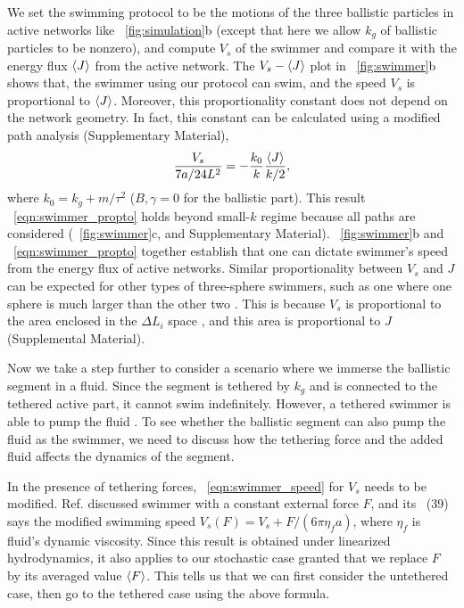 \documentclass[
 preprint,
 preprintnumbers,
 amsmath,amssymb,
 aps,
 pre,
 longbibliography,
 10pt, twocolumn
]{revtex4-1}
\begin{document}
We set the swimming protocol to be the motions of the three ballistic particles in active networks like \figurename~\ref{fig:simulation}b (except that here we allow $k_g$ of ballistic particles to be nonzero),
and compute $V_s$ of the swimmer and compare it with the energy flux $\expval{J}$ from the active network. 
The $V_s-\expval{J}$ plot in \figurename~\ref{fig:swimmer}b shows that, the swimmer using our protocol can swim, and the speed $V_s$ is proportional to $\expval{J}$. Moreover, this proportionality constant does not depend on the network geometry. 
In fact, this constant can be calculated using a modified path analysis (Supplementary Material), 
\begin{equation} \label{eqn:swimmer_propto}
    \frac{V_s}{7a/24L^2} = -\frac{k_0}{k} \frac{\expval{J}}{k/2},
\end{equation}
where $k_0 = k_g + m/\tau^2$ ($B,\gamma=0$ for the ballistic part).
This result \eqnname~\eqref{eqn:swimmer_propto} holds beyond small-$k$ regime because all paths are considered (\figurename~\ref{fig:swimmer}c, and Supplementary Material).
\figurename~\ref{fig:swimmer}b and \eqnname~\eqref{eqn:swimmer_propto} together establish that one can dictate swimmer's speed from the energy flux of active networks.
Similar proportionality between $V_s$ and $J$ can be expected for other types of three-sphere swimmers, such as one where one sphere is much larger than the other two \cite{Golestanian2008Three-sphereContainer}. This is because $V_s$ is proportional to the area enclosed in the $\Delta L_i$ space \cite{Golestanian2009StochasticSwimmers}, and this area is proportional to $J$ (Supplemental Material).

Now we take a step further to consider a scenario where we immerse the ballistic segment in a fluid. Since the segment is tethered by $k_g$ and is connected to the tethered active part, it cannot swim indefinitely. However, a tethered swimmer is able to pump the fluid \cite{Leoni2009ANumber}. To see whether the ballistic segment can also pump the fluid as the swimmer, we need to discuss how the tethering force and the added fluid affects the dynamics of the segment.

In the presence of tethering forces, \eqnname~\eqref{eqn:swimmer_speed} for $V_s$ needs to be modified.
Ref. \cite{Golestanian2008AnalyticNumber} discussed swimmer with a constant external force $F$, and its \eqnname~(39) says the modified swimming speed $V_s(F) = V_s + F/(6\pi\eta_f a)$, where $\eta_f$ is fluid's dynamic viscosity.
Since this result is obtained under linearized hydrodynamics, it also applies to our stochastic case granted that we replace $F$ by its averaged value $\expval{F}$.
This tells us that we can first consider the untethered case, then go to the tethered case using the above formula.
\end{document}
